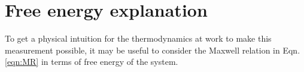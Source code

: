 \section{Free energy explanation}
\label{sec:fenergy}

To get a physical intuition for the thermodynamics at work to make this measurement possible, it may be useful to consider the Maxwell relation in Eqn.\ref{eqn:MR} in terms of free energy of the system. 

\endinput

Any text after an \endinput is ignored.
You could put scraps here or things in progress.
